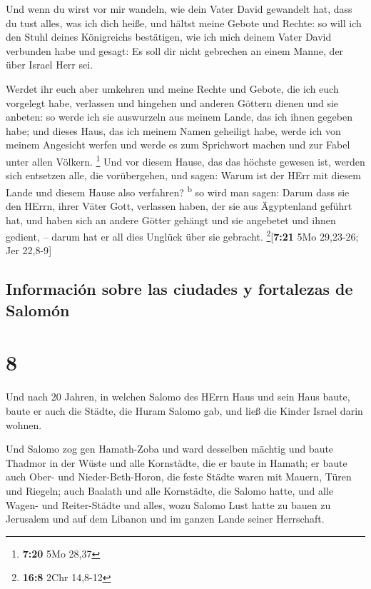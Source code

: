  Und wenn du wirst vor mir wandeln, wie dein Vater David
gewandelt hat, dass du tust alles, was ich dich heiße, und hältst meine
Gebote und Rechte:  so will ich den Stuhl deines
Königreichs bestätigen, wie ich mich deinem Vater David verbunden habe
und gesagt: Es soll dir nicht gebrechen an einem Manne, der über Israel
Herr sei.

 Werdet ihr euch aber umkehren und meine Rechte und
Gebote, die ich euch vorgelegt habe, verlassen und hingehen und anderen
Göttern dienen und sie anbeten:  so werde ich sie
auswurzeln aus meinem Lande, das ich ihnen gegeben habe; und dieses
Haus, das ich meinem Namen geheiligt habe, werde ich von meinem
Angesicht werfen und werde es zum Sprichwort machen und zur Fabel unter
allen Völkern. \footnote{\textbf{7:20} 5Mo 28,37}  Und
vor diesem Hause, das das höchste gewesen ist, werden sich entsetzen
alle, die vorübergehen, und sagen: Warum ist der HErr mit diesem Lande
und diesem Hause also verfahren? \textsuperscript{b}  so
wird man sagen: Darum dass sie den HErrn, ihrer Väter Gott, verlassen
haben, der sie aus Ägyptenland geführt hat, und haben sich an andere
Götter gehängt und sie angebetet und ihnen gedient, -- darum hat er all
dies Unglück über sie gebracht. \footnote{\textbf{16:8} 2Chr 14,8-12}{[}\textbf{7:21}
5Mo 29,23-26; Jer 22,8-9{]}

\hypertarget{informaciuxf3n-sobre-las-ciudades-y-fortalezas-de-salomuxf3n}{%
\subsection{Información sobre las ciudades y fortalezas de
Salomón}\label{informaciuxf3n-sobre-las-ciudades-y-fortalezas-de-salomuxf3n}}

\hypertarget{section-7}{%
\section{8}\label{section-7}}

 Und nach 20 Jahren, in welchen Salomo des HErrn Haus und
sein Haus baute,  baute er auch die Städte, die Huram
Salomo gab, und ließ die Kinder Israel darin wohnen.

 Und Salomo zog gen Hamath-Zoba und ward desselben mächtig
 und baute Thadmor in der Wüste und alle Kornstädte, die
er baute in Hamath;  er baute auch Ober- und
Nieder-Beth-Horon, die feste Städte waren mit Mauern, Türen und Riegeln;
 auch Baalath und alle Kornstädte, die Salomo hatte, und
alle Wagen- und Reiter-Städte und alles, wozu Salomo Lust hatte zu bauen
zu Jerusalem und auf dem Libanon und im ganzen Lande seiner Herrschaft.

